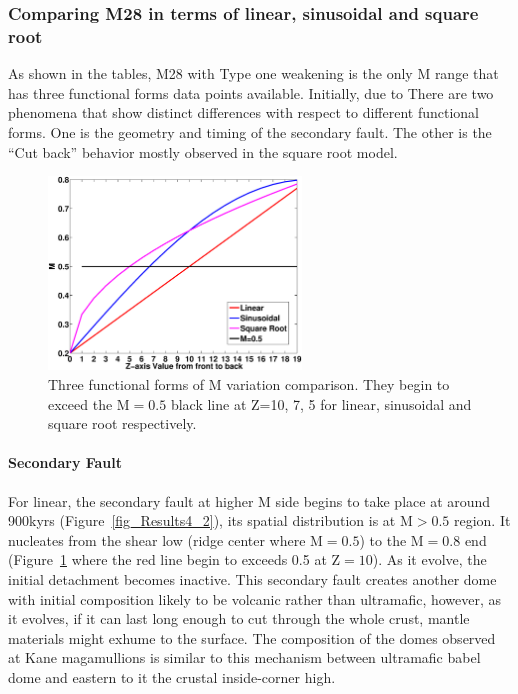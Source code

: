 \subsubsection{Comparing M28 in terms of linear, sinusoidal and square root}
As shown in the tables, M28 with Type one weakening is the only M range that has three functional forms data points available. Initially, due to There are two phenomena that show distinct differences with respect to different functional forms. One is the geometry and timing of the secondary fault. The other is the ``Cut back'' behavior mostly observed in the square root model.

\begin{figure}[hc]
  \centering
    \includegraphics[width=0.6\textwidth]{fig_Results4_1.eps}
  \caption{Three functional forms of M variation comparison. They begin to exceed the M$=0.5$ black line at Z=10, 7, 5 for linear, sinusoidal and square root respectively.}
 \label{fig_Results4_1}
\end{figure}   

\paragraph{Secondary Fault}

For linear, the secondary fault at higher M side begins to take place at around 900kyrs (Figure~\ref{fig_Results4_2}), its spatial distribution is at M$>0.5$ region. It nucleates from the shear low (ridge center where M$=0.5$) to the M$=0.8$ end (Figure~\ref{fig_Results4_1} where the red line begin to exceeds 0.5 at Z$=10$). As it evolve, the initial detachment becomes inactive. This secondary fault creates another dome with initial composition likely to be volcanic rather than ultramafic, however, as it evolves, if it can last long enough to cut through the whole crust, mantle materials might exhume to the surface. The composition of the domes observed at Kane magamullions is similar to this mechanism between ultramafic babel dome and eastern to it the crustal inside-corner high. 

